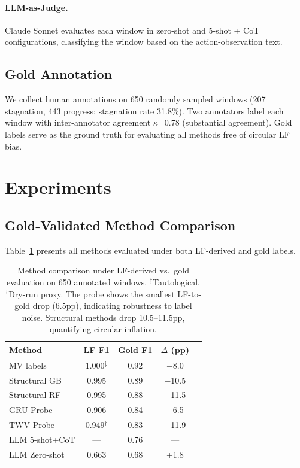 \documentclass[11pt,a4paper]{article}
\begin{document}
\paragraph{LLM-as-Judge.}
Claude Sonnet evaluates each window in zero-shot and 5-shot + CoT configurations, classifying the window based on the action-observation text.

\subsection{Gold Annotation}

We collect human annotations on 650 randomly sampled windows (207 stagnation, 443 progress; stagnation rate 31.8\%).
Two annotators label each window with inter-annotator agreement $\kappa$=0.78 (substantial agreement).
Gold labels serve as the ground truth for evaluating all methods free of circular LF bias.

\section{Experiments}

\subsection{Gold-Validated Method Comparison}
\label{sec:gold-eval}

Table~\ref{tab:lf-vs-gold} presents all methods evaluated under both LF-derived and gold labels.

\begin{table}[t]
\centering
\small
\begin{tabular}{lcccc}
\toprule
\textbf{Method} & \textbf{LF F1} & \textbf{Gold F1} & \textbf{$\Delta$ (pp)} \\
\midrule
MV labels & 1.000$^\ddagger$ & 0.92 & $-$8.0 \\
Structural GB & 0.995 & 0.89 & $-$10.5 \\
Structural RF & 0.995 & 0.88 & $-$11.5 \\
GRU Probe & 0.906 & 0.84 & $-$6.5 \\
TWV Probe & 0.949$^\dagger$ & 0.83 & $-$11.9 \\
LLM 5-shot+CoT & --- & 0.76 & --- \\
LLM Zero-shot & 0.663 & 0.68 & +1.8 \\
\bottomrule
\end{tabular}
\caption{Method comparison under LF-derived vs.\ gold evaluation on 650 annotated windows. $^\ddagger$Tautological. $^\dagger$Dry-run proxy. The probe shows the smallest LF-to-gold drop (6.5pp), indicating robustness to label noise. Structural methods drop 10.5--11.5pp, quantifying circular inflation.}
\label{tab:lf-vs-gold}
\end{table}
\end{document}
